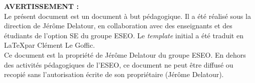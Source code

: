 \noindent
\textbf{AVERTISSEMENT :}\\
Le présent document est un document à but pédagogique. Il a été réalisé sous la direction de Jérôme Delatour, en collaboration avec des enseignants et des étudiants de l'option SE du groupe ESEO. Le \textit{template} initial a été traduit en \LaTeX par Clément Le Goffic.\\
Ce document est la propriété de Jérôme Delatour du groupe ESEO. En dehors des activités pédagogiques de l'ESEO, ce document ne peut être diffusé ou recopié sans l’autorisation écrite de son propriétaire (Jérôme Delatour).